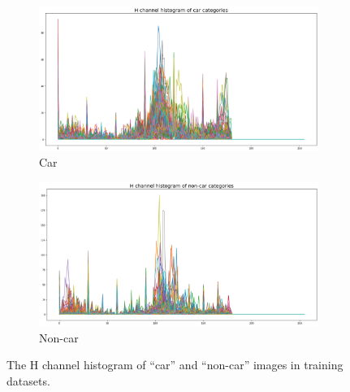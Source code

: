 \documentclass{article}[12pt]
\begin{document}
\begin{figure}[H]
    \centering
    \begin{subfigure}[b]{0.45\textwidth}
        \centering
        \includegraphics[width=\textwidth]{figure/H_car.png}
        \caption{Car}
    \end{subfigure}
    \hfill
    \begin{subfigure}[b]{0.45\textwidth}
        \centering
        \includegraphics[width=\textwidth]{figure/H_noncar.png}
        \caption{Non-car}
    \end{subfigure}
    \caption{The H channel histogram of ``car'' and ``non-car'' images in training datasets.}
    \label{fig:hsv_h}
\end{figure}
\end{document}
